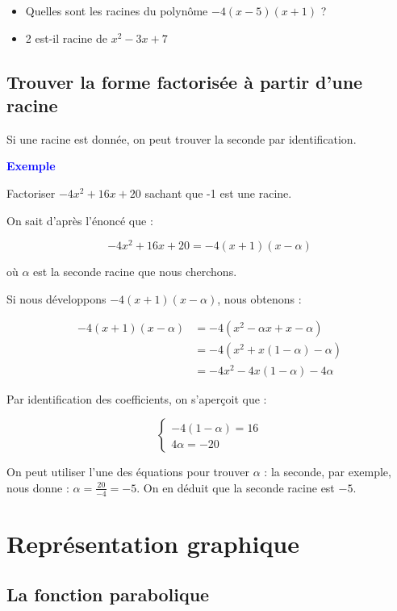 \documentclass[a4paper,12pt]{article}
\begin{document}
\begin{itemize}[noitemsep]
  \item Quelles sont les racines du polynôme $-4(x - 5)(x + 1)$ ?
  \item 2 est-il racine de \(x^2 - 3x + 7\) 
\end{itemize}

\subsection*{Trouver la forme factorisée à partir d'une racine}

Si une racine est donnée, on peut trouver la seconde par identification.

\textbf{\textcolor{blue}{Exemple}} \par 

Factoriser $-4x^2 + 16x + 20$ sachant que -1 est une racine.

On sait d'après l'énoncé que :

\[
-4x^2 + 16x + 20 = -4(x + 1)(x - \alpha)
\]

où $\alpha$ est la seconde racine que nous cherchons.

Si nous développons $-4(x + 1)(x - \alpha)$, nous obtenons :

\begin{align}
  -4(x + 1)(x - \alpha) &= -4(x^2 - \alpha x + x - \alpha) \\
  &= -4(x^2 + x(1 - \alpha) - \alpha) \\
  &= -4x^2 - 4x(1 - \alpha) - 4\alpha
\end{align}

Par identification des coefficients, on s'aperçoit que :


\begin{equation*}
\begin{cases}
    -4(1 - \alpha) = 16  \\
    4\alpha = -20 
\end{cases}
\end{equation*}

On peut utiliser l'une des équations pour trouver $\alpha$ : la seconde, par exemple, nous donne : $\alpha = \frac{20}{-4} = -5$. On en déduit que la seconde racine est $-5$.

\section*{Représentation graphique}

\subsection*{La fonction parabolique}
\end{document}
